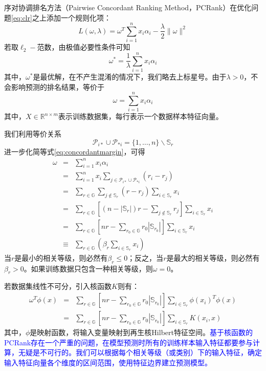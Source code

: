 序对协调排名方法（Pairwise Concordant Ranking Method，PCRank）在优化问题\eqref{eq:clr}之上添加一个规则化项：
\begin{equation}
    L(\omega, \lambda) = \omega^T \sum\limits_{i=1}^n x_i \alpha_i - \frac{\lambda}{2} \| \omega \|^2
\end{equation}
若取$\ell_2-$范数，由极值必要性条件可知
\begin{equation}
    \omega^* = \frac{1}{\lambda} \sum\limits_{i=1}^n x_i \alpha_i
\end{equation}
其中，$\omega^*$是最优解，在不产生混淆的情况下，我们略去上标星号。由于$\lambda>0$，不会影响预测的排名结果，等价于
\begin{equation}
    \omega = \sum\limits_{i=1}^n x_i \alpha_i
\end{equation}
其中，$X\in\mathbb{R}^{n\times m}$表示训练数据集，每行表示一个数据样本特征向量。

我们利用等价关系
\[
    \mathscr P_{i*} \cup \mathscr P_{*i} = \{1,\ldots,n\}\backslash \mathbb{S}_r
\]
进一步化简等式\eqref{eq:concordantmargin}，可得
\begin{equation}
 \begin{array}{lll}
    \omega & = & \sum\limits_{i=1}^n x_i \alpha_i \\
    & = & \sum\limits_{i=1}^n x_i \sum\limits_{j\in \mathscr P_{i*} \cup \mathscr P_{*i}} (r_i - r_j)\\
    & = & \sum\limits_{r\in \mathbb{G}} \sum\limits_{j\notin \mathbb{S}_r} (r - r_j) \sum\limits_{i\in \mathbb{S}_r} x_i\\
    & = & \sum\limits_{r\in \mathbb{G}} [(n - |\mathbb{S}_r|)r -\sum\limits_{j\notin \mathbb{S}_r} r_j] \sum\limits_{i\in \mathbb{S}_r} x_i\\
    & = & \sum\limits_{r\in \mathbb{G}} [nr - \sum\limits_{r_0\in \mathbb{G}} r_0|\mathbb{S}_{r_0}|] \sum\limits_{i\in \mathbb{S}_r} x_i \\
    & \equiv & \sum\limits_{r\in \mathbb{G}} (\beta_r \sum\limits_{i\in \mathbb{S}_r} x_i)
 \end{array}
\end{equation}
当$r$是最小的相关等级，则必然有$\beta_r\le 0$；反之，当$r$是最大的相关等级，则必然有$\beta_r>0$。如果训练数据只包含一种相关等级，则$\omega=0$。

若数据集线性不可分，引入核函数$K$则有：
\begin{equation}
    \begin{array}{lll}
      \omega^T \phi(x) & = & \sum\limits_{r\in \mathbb{G}} [nr - \sum\limits_{r_0\in \mathbb{G}} r_0|\mathbb{S}_{r_0}|] \sum\limits_{i\in \mathbb{S}_r} \phi(x_i)^T \phi(x) \\
      & = & \sum\limits_{r\in \mathbb{G}} [nr - \sum\limits_{r_0\in \mathbb{G}} r_0|\mathbb{S}_{r_0}|] \sum\limits_{i\in \mathbb{S}_r} K(x_i,x)
    \end{array}
\end{equation}
其中，$\phi$是映射函数，将输入变量映射到再生核Hilbert特征空间。\textcolor{blue}{基于核函数的PCRank存在一个严重的问题，在模型预测时所有的训练样本输入特征都要参与计算，无疑是不可行的。我们可以根据每个相关等级（或类别）下的输入特征，确定输入特征向量各个维度的区间范围，使用特征边界建立预测模型。}

